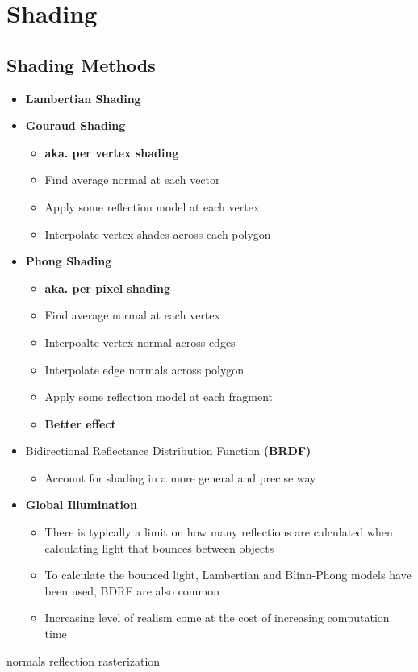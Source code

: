 \chapter{Shading}

\section{Shading Methods}

  \begin{itemize}
    \item \textbf{Lambertian Shading}
    \item \textbf{Gouraud Shading}
    \begin{itemize}
      \item \textbf{aka. per vertex shading}
      \item Find average normal at each vector
      \item Apply some reflection model at each vertex
      \item Interpolate vertex shades across each polygon
    \end{itemize}

    \item \textbf{Phong Shading}
    \begin{itemize}
      \item \textbf{aka. per pixel shading}
      \item Find average normal at each vertex
      \item Interpoalte vertex normal across edges
      \item Interpolate edge normals across polygon
      \item Apply some reflection model at each fragment
      \item \textbf{Better effect}
    \end{itemize}

    \item Bidirectional Reflectance Distribution Function \textbf{(BRDF)}
    \begin{itemize}
      \item Account for shading in a more general and precise way
    \end{itemize}

    \item \textbf{Global Illumination}
    \begin{itemize}
      \item There is typically a limit on how many reflections are calculated
      when calculating light that bounces between objects
      \item To calculate the bounced light, Lambertian and Blinn-Phong models
      have been used, BDRF are also common
      \item Increasing level of realism come at the cost of increasing
      computation time
    \end{itemize}
  \end{itemize}

{normals}
{reflection}
{rasterization}
